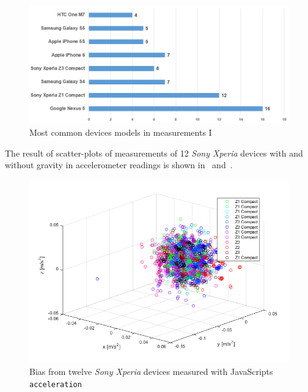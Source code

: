 \begin{figure}[ht]
	\centering
	\includegraphics[scale=0.5]{img/measure1-devices}
	\caption{Most common devices models in measurements I}
	\label{fig:measure1-topDevices}
\end{figure}
The result of scatter-plots of measurements of 12 \textit{Sony Xperia} devices with and without gravity in accelerometer readings is shown in~ and~.
\begin{figure}[ht]
	\centering
	\includegraphics[scale=0.6]{img/res-measure1-scatter-notG}
	\caption{Bias from twelve \textit{Sony Xperia} devices measured with JavaScripts \texttt{acceleration}}
	\label{fig:scatter-withoutGrav}
\end{figure}
